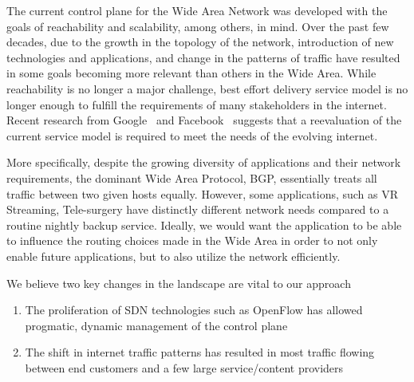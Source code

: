 The current control plane for the Wide Area Network was developed with the goals of reachability and scalability, among others, in mind. Over the past few decades, due to the growth in the topology of the network, introduction of new technologies and applications, and change in the patterns of traffic have resulted in some goals becoming more relevant than others in the Wide Area. While reachability is no longer a major challenge, best effort delivery service model is no longer enough to fulfill the requirements of many stakeholders in the internet. Recent research from Google~\cite{yap2017taking} and Facebook~\cite{schlinker2017engineering} suggests that a reevaluation of the current service model is required to meet the needs of the evolving internet.

More specifically, despite the growing diversity of applications and their network requirements, the dominant Wide Area Protocol, BGP, essentially treats all traffic between two given hosts equally. However, some applications, such as VR Streaming, Tele-surgery have distinctly different network needs compared to a routine nightly backup service. Ideally, we would want the application to be able to influence the routing choices made in the Wide Area in order to not only enable future applications, but to also utilize the network efficiently.

We believe two key changes in the landscape are vital to our approach

\begin{enumerate}
\item The proliferation of SDN technologies such as OpenFlow has allowed progmatic, dynamic management of the control plane
\item The shift in internet traffic patterns has resulted in most traffic flowing between end customers and a few large service/content providers
\end{enumerate}
